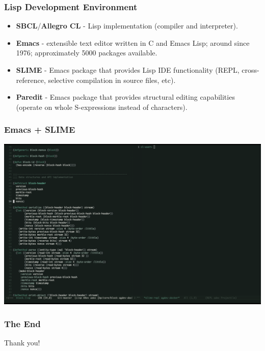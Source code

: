 \documentclass{beamer}
\begin{document}
\begin{frame}
  \frametitle{Lisp Development Environment}
  \begin{itemize}
  \item \textbf{SBCL}/\textbf{Allegro CL} - Lisp implementation (compiler and
    interpreter).
  \item \textbf{Emacs} - extensible text editor written in C and Emacs Lisp;
    around since 1976; approximately 5000 packages available.
  \item \textbf{SLIME} - Emacs package that provides Lisp IDE functionality
    (REPL, cross-reference, selective compilation in source files, etc).
  \item \textbf{Paredit} - Emacs package that provides structural editing
    capabilities (operate on whole S-expressions instead of characters).
  \end{itemize}
\end{frame}

\begin{frame}
  \frametitle{Emacs + SLIME}
  \includegraphics[width=\columnwidth]{emacs-lisp-ide}
\end{frame}

\begin{frame}
  \frametitle{The End}
  \begin{center}
    Thank you!
  \end{center}
\end{frame}
\end{document}
